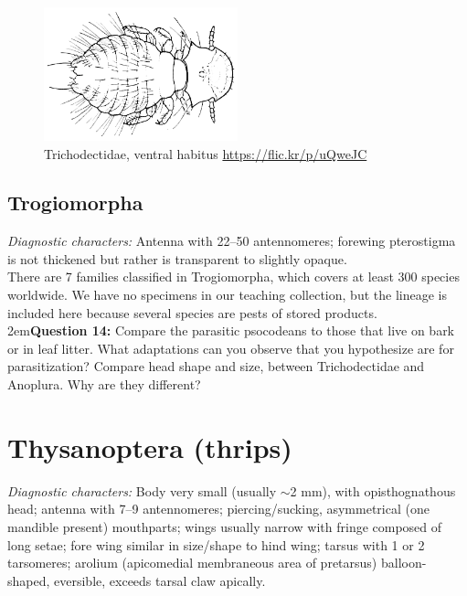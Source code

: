 \documentclass[letterpaper, 11pt]{article}
\begin{document}
\begin{figure}[ht!]
 \centering
 \includegraphics[width=0.5\textwidth]{trichodectidae.png}
 \caption{Trichodectidae, ventral habitus \citep[][Fig. 9B]{snodgrass1944feeding} \url{https://flic.kr/p/uQweJC}}
 \label{fig:trichodectid}
\end{figure}

\subsection{Trogiomorpha}
\noindent{}\textit{Diagnostic characters:} Antenna with 22--50 antennomeres; forewing pterostigma is not thickened but rather is transparent to slightly opaque.\\

\noindent{}There are 7 families classified in Trogiomorpha, which covers at least 300 species worldwide. We have no specimens in our teaching collection, but the lineage is included here because several species are pests of stored products.\\

\hangindent2em\textbf{Question 14:} Compare the parasitic psocodeans to those that live on bark or in leaf litter. What adaptations can you observe that you hypothesize are for parasitization? Compare head shape and size, between Trichodectidae and Anoplura. Why are they different?\\

\section{Thysanoptera (thrips)}
\noindent{}\textit{Diagnostic characters:} Body very small (usually $\sim$2 mm), with opisthognathous head; antenna with 7--9 antennomeres; piercing/sucking, asymmetrical (one mandible present) mouthparts; wings usually narrow with fringe composed of long setae; fore wing similar in size/shape to hind wing; tarsus with 1 or 2 tarsomeres; arolium (apicomedial membraneous area of pretarsus) balloon-shaped, eversible, exceeds tarsal claw apically.\\
\end{document}
